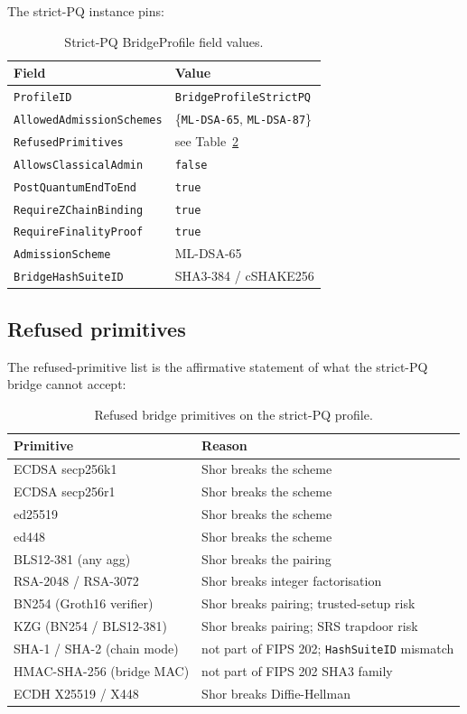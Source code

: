The strict-PQ instance pins:

\begin{table}[H]
\centering
\caption{Strict-PQ BridgeProfile field values.}
\label{tab:bridge-profile-strict}
\begin{tabular}{ll}
\toprule
Field & Value \\
\midrule
\texttt{ProfileID}              & \texttt{BridgeProfileStrictPQ} \\
\texttt{AllowedAdmissionSchemes} & \{\texttt{ML-DSA-65}, \texttt{ML-DSA-87}\} \\
\texttt{RefusedPrimitives}      & see Table~\ref{tab:bridge-refused} \\
\texttt{AllowsClassicalAdmin}   & \texttt{false} \\
\texttt{PostQuantumEndToEnd}    & \texttt{true} \\
\texttt{RequireZChainBinding}   & \texttt{true} \\
\texttt{RequireFinalityProof}   & \texttt{true} \\
\texttt{AdmissionScheme}        & ML-DSA-65 \\
\texttt{BridgeHashSuiteID}      & SHA3-384 / cSHAKE256 \\
\bottomrule
\end{tabular}
\end{table}

\subsection{Refused primitives}

The refused-primitive list is the affirmative statement of what the strict-PQ
bridge cannot accept:

\begin{table}[H]
\centering
\caption{Refused bridge primitives on the strict-PQ profile.}
\label{tab:bridge-refused}
\begin{tabular}{ll}
\toprule
Primitive & Reason \\
\midrule
ECDSA secp256k1     & Shor breaks the scheme \\
ECDSA secp256r1     & Shor breaks the scheme \\
ed25519             & Shor breaks the scheme \\
ed448               & Shor breaks the scheme \\
BLS12-381 (any agg) & Shor breaks the pairing \\
RSA-2048 / RSA-3072 & Shor breaks integer factorisation \\
BN254 (Groth16 verifier) & Shor breaks pairing; trusted-setup risk \\
KZG (BN254 / BLS12-381)  & Shor breaks pairing; SRS trapdoor risk \\
SHA-1 / SHA-2 (chain mode) & not part of FIPS 202; \texttt{HashSuiteID} mismatch \\
HMAC-SHA-256 (bridge MAC)  & not part of FIPS 202 SHA3 family \\
ECDH X25519 / X448  & Shor breaks Diffie-Hellman \\
\bottomrule
\end{tabular}
\end{table}

